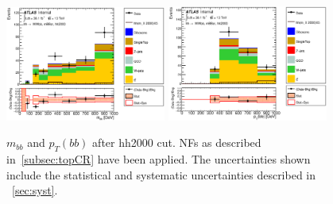 \begin{figure}[!h]
\begin{center}
\includegraphics*[width=0.47\textwidth] {figures/ControlPlots/reOpt2000/C_mBBcr_reOpt2000_bbpt350_wwpt250_drww15_hh2000_bbMass_regionA_met25d020.eps}
\includegraphics*[width=0.47\textwidth] {figures/ControlPlots/reOpt2000/C_mBBcr_reOpt2000_bbpt350_wwpt250_drww15_hh2000_bbPt_regionA_met25d020.eps}
\caption[$m_{bb}$ and  $p_{T}(bb)$ after hh2000 cut.]{$m_{bb}$ and  $p_{T}(bb)$ after hh2000 cut.  \ttbar NFs as described in~\ref{subsec:topCR} have been applied. The uncertainties shown include the statistical and systematic uncertainties described in ~\ref{sec:syst}.}
\end{center}
\end{figure}

